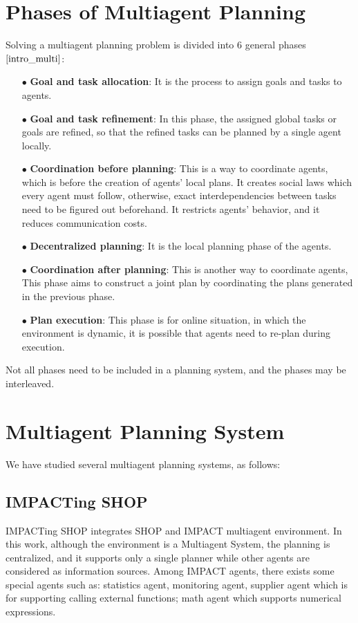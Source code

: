 \section{Phases of Multiagent Planning}
\label{phases_multi}
Solving a multiagent planning problem is divided into 6 general phases$\cite{intro_multi}$:
\begin{itemize}
\item[$\bullet$] \textbf{Goal and task allocation}: 
It is the process to assign goals and tasks to agents.
\item[$\bullet$] \textbf{Goal and task refinement}: 
In this phase, the assigned global tasks or goals are refined, so that the refined tasks can be planned by a single agent locally.
\item[$\bullet$] \textbf{Coordination before planning}: 
This is a way to coordinate agents, which is before the creation of agents’ local plans. It creates social laws which every agent must follow, otherwise, exact interdependencies between tasks need to be figured out beforehand. It restricts agents’ behavior, and it reduces communication costs.
\item[$\bullet$] \textbf{Decentralized planning}: 
It is the local planning phase of the agents.
\item[$\bullet$] \textbf{Coordination after planning}: \label{sec:Coordination_after_planning}
This is another way to coordinate agents, This phase aims to construct a joint plan by coordinating the plans generated in the previous phase.
\item[$\bullet$] \textbf{Plan execution}: 
This phase is for online situation, in which the environment is dynamic, it is possible that agents need to re-plan during execution.
\end{itemize}
Not all phases need to be included in a planning system, and the phases may be interleaved.

\section{Multiagent Planning System}
We have studied several multiagent planning systems, as follows:

\subsection{IMPACTing SHOP}
IMPACTing SHOP\cite{ishop} integrates SHOP and IMPACT\cite{Impact} multiagent environment. In this work, although the environment is a Multiagent System, the planning is centralized, and it supports only a single planner while other agents are considered as information sources. Among IMPACT agents, there exists some special agents such as: statistics agent, monitoring agent, supplier agent which is for supporting calling external functions; math agent which supports numerical expressions.

